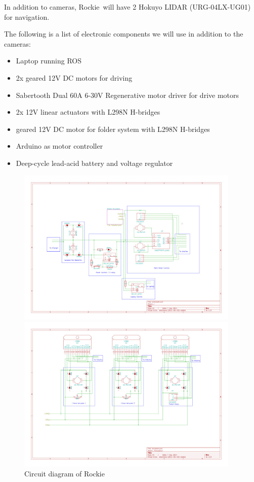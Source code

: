 \documentclass{paper}
\newcommand \robotName{Rockie} 		%
\begin{document}
In addition to cameras, \robotName \ will have 2 Hokuyo LIDAR (URG-04LX-UG01) for navigation.


	The following is a list of electronic components we will use in addition to the cameras:
\begin{itemize}
	\item Laptop running ROS
	\item 2x geared 12V DC motors for driving
  \item Sabertooth Dual 60A 6-30V Regenerative motor driver for drive motors
  \item 2x 12V linear actuators with L298N H-bridges
  \item geared 12V DC motor for folder system with L298N H-bridges
	\item Arduino as motor controller
	\item Deep-cycle lead-acid battery and voltage regulator
\end{itemize}


\begin{figure}[htp]
\centering

\includegraphics[width=0.95\textwidth]{fig/schematic.jpg}


\includegraphics[width=0.95\textwidth]{fig/schematic-Actuators.jpg} 
\caption{Circuit diagram of \robotName}
\label{fig:sch}
\end{figure}
\end{document}
